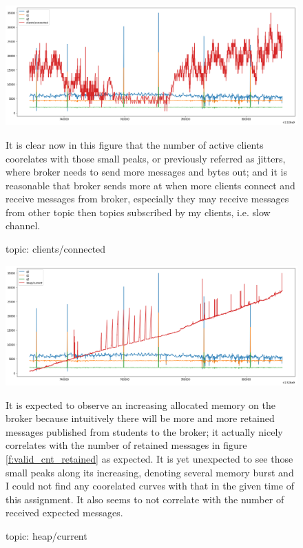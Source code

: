 \documentclass[12pt, letterpaper]{article}
\begin{document}
\begin{figure}
	\setlength{\tabcolsep}{0pt}
	\caption{topic: clients/connected}
	\label{f:valid_cnt_clients_connected}
	\begin{center}
		\includegraphics[width=\textwidth]{valid_cnt/valid_cnt-clients_connected}	
	\end{center}
	It is clear now in this figure that the number of active clients coorelates with those small peaks, or previously referred as jitters, where broker needs to send more messages and bytes out; and it is reasonable that broker sends more at when more clients connect and receive messages from broker, especially they may receive messages from other topic then topics subscribed by my clients, i.e. slow channel.
\end{figure}

\begin{figure}
	\setlength{\tabcolsep}{0pt}
	\caption{topic: heap/current}
	\label{f:valid_cnt_heap_current}
	\begin{center}
		\includegraphics[width=\textwidth]{valid_cnt/valid_cnt-heap_current}	
	\end{center}
	It is expected to observe an increasing allocated memory on the broker because intuitively there will be more and more retained messages published from students to the broker; it actually nicely correlates with the number of retained messages in figure \ref{f:valid_cnt_retained} as expected. It is yet unexpected to see those small peaks along its increasing, denoting several memory burst and I could not find any coorelated curves with that in the given time of this assignment. It also seems to not correlate with the number of received expected messages.
\end{figure}
\end{document}
